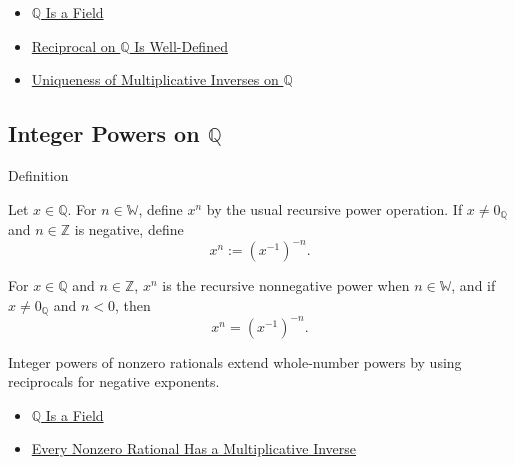 \begin{dependencies}
\begin{itemize}
  \item \hyperref[thm:q-is-a-field]{$\mathbb{Q}$ Is a Field}
  \item \hyperref[thm:reciprocal-on-q-well-defined]{Reciprocal on $\mathbb{Q}$ Is Well-Defined}
  \item \hyperref[cor:uniqueness-multiplicative-inverse-on-q]{Uniqueness of Multiplicative Inverses on $\mathbb{Q}$}
\end{itemize}
\end{dependencies}

\subsection*{\texorpdfstring{Integer Powers on $\mathbb{Q}$}{Integer Powers on Q}}

\begin{definitionbox}{Definition}
\begin{definition}
\label{def:integer-power-on-q}
Let $x\in\mathbb{Q}$. For $n\in\mathbb{W}$, define $x^n$ by the usual
recursive power operation. If $x\ne 0_{\mathbb{Q}}$ and $n\in\mathbb{Z}$ is
negative, define
\[
x^n:=(x^{-1})^{-n}.
\]
\end{definition}
\end{definitionbox}

\begin{remark*}
For $x\in\mathbb{Q}$ and $n\in\mathbb{Z}$, $x^n$ is the recursive nonnegative
power when $n\in\mathbb{W}$, and if $x\ne0_{\mathbb{Q}}$ and $n<0$, then
\[
x^n=(x^{-1})^{-n}.
\]
\end{remark*}

\begin{remark*}[Interpretation]
Integer powers of nonzero rationals extend whole-number powers by using
reciprocals for negative exponents.
\end{remark*}

\begin{dependencies}
\begin{itemize}
  \item \hyperref[thm:q-is-a-field]{$\mathbb{Q}$ Is a Field}
  \item \hyperref[thm:every-nonzero-rational-has-multiplicative-inverse]{Every Nonzero Rational Has a Multiplicative Inverse}
\end{itemize}
\end{dependencies}


